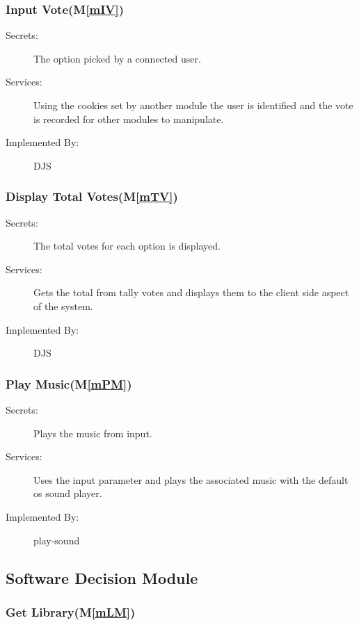 \documentclass[12pt, titlepage]{article}
\newcommand{\mref}[1]{M\ref{#1}}
\begin{document}
\subsubsection{Input Vote(\mref{mIV})}


\begin{description}
\item[Secrets:]The option picked by a connected user.
\item[Services:]Using the cookies set by another module the user is identified and the vote is recorded for other modules to manipulate.
\item[Implemented By:] DJS
\end{description}


\subsubsection{Display Total Votes(\mref{mTV})}


\begin{description}
\item[Secrets:]The total votes for each option is displayed.
\item[Services:]Gets the total from tally votes and displays them to the client side aspect of the system.
\item[Implemented By:] DJS
\end{description}


\subsubsection{Play Music(\mref{mPM})}


\begin{description}
\item[Secrets:] Plays the music from input.
\item[Services:]Uses the input parameter and plays the associated music with the default os sound player.
\item[Implemented By:] play-sound
\end{description}




\subsection{Software Decision Module}


\subsubsection{Get Library(\mref{mLM})}
\end{document}
